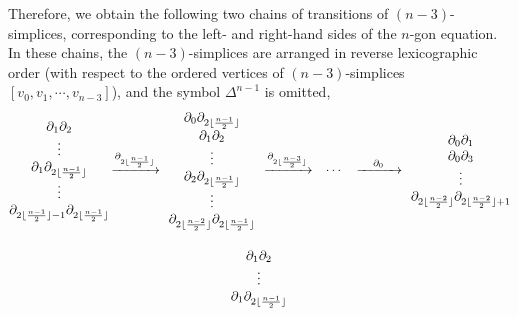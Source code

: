 \documentclass[10pt,a4paper]{amsart}
\numberwithin{equation}{section}
\theoremstyle{definition}
\begin{document}
Therefore, we obtain the following two chains of transitions of $(n-3)$-simplices, corresponding to the left- and right-hand sides of the $n$-gon equation.
In these chains, the $(n-3)$-simplices are arranged in reverse lexicographic order (with respect to the ordered vertices of $(n-3)$-simplices $[v_0,v_1,\cdots, v_{n-3}]$), and the symbol $\Delta^{n-1}$ is omitted,
\begin{gather*}
 \begin{array}{@{}c@{\,}c@{\,}c@{\,}ccc@{\,}c@{}}
 \begin{array}{@{}c@{}}
 \partial_1\partial_2\\
 \vdots\\
 \partial_1\partial_{2\lfloor\frac{n-1}{2}\rfloor}\\
 \vdots\\
 \partial_{2\lfloor\frac{n-1}{2}\rfloor-1}\partial_{2\lfloor\frac{n-1}{2}\rfloor}\\
 \end{array}
 &
 \xrightarrow{\partial_{2\lfloor\frac{n-1}{2}\rfloor}}
 &
 \begin{array}{c}
 \partial_0\partial_{2\lfloor\frac{n-1}{2}\rfloor}\\
 \partial_1\partial_2\\
 \vdots\\
 \partial_2\partial_{2\lfloor\frac{n-1}{2}\rfloor}\\
 \vdots\\
 \partial_{2\lfloor\frac{n-2}{2}\rfloor}\partial_{2\lfloor\frac{n-1}{2}\rfloor}
 \end{array}
 &
 \xrightarrow{\partial_{2\lfloor\frac{n-3}{2}\rfloor}}
 &
 \cdots
 &
 \xrightarrow{\quad\partial_0\quad}
 &
 \begin{array}{c@{}}
 \partial_0\partial_1\\
 \partial_0\partial_3\\
 \vdots\\
 \partial_{2\lfloor\frac{n-2}{2}\rfloor}\partial_{2\lfloor\frac{n-2}{2}\rfloor+1}
 \end{array}
 \end{array}\\[10pt]
 \begin{array}{@{}c@{\,}c@{\,}c@{\,}ccc@{\,}c@{}}
 \begin{array}{@{}c@{}}
 \partial_1\partial_2\\
 \vdots\\
 \partial_1\partial_{2\lfloor\frac{n-1}{2}\rfloor}\\

\end{array}
\end{array}
\end{gather*}
\end{document}
